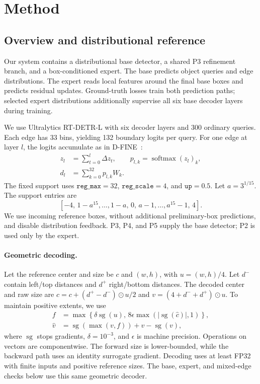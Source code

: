 \section{Method}
\subsection{Overview and distributional reference}
Our system contains a distributional base detector, a shared P3 refinement branch, and a box-conditioned expert. The base predicts object queries and edge distributions. The expert reads local features around the final base boxes and predicts residual updates. Ground-truth losses train both prediction paths; selected expert distributions additionally supervise all six base decoder layers during training.

We use Ultralytics RT-DETR-L with six decoder layers and 300 ordinary queries. Each edge has 33 bins, yielding 132 boundary logits per query. For one edge at layer $l$, the logits accumulate as in D-FINE~\cite{peng2025dfine}:
\begin{equation}
\begin{aligned}
z_l&=\sum_{t=0}^{l}\Delta z_t,\qquad
p_{l,k}=\operatorname{softmax}(z_l)_k,\\
d_l&=\sum_{k=0}^{32}p_{l,k}W_k .
\end{aligned}
\label{eq:distribution}
\end{equation}
The fixed support uses $\texttt{reg\_max}=32$, $\texttt{reg\_scale}=4$, and $\texttt{up}=0.5$. Let $a=3^{1/15}$. The support entries are
\[
[-4,\,1-a^{15},\ldots,1-a,\,0,\,a-1,\ldots,a^{15}-1,\,4].
\]
We use incoming reference boxes, without additional preliminary-box predictions, and disable distribution feedback. P3, P4, and P5 supply the base detector; P2 is used only by the expert.


\paragraph{Geometric decoding.}
Let the reference center and size be $c$ and $(w,h)$, with $u=(w,h)/4$. Let $d^{-}$ contain left/top distances and $d^{+}$ right/bottom distances. The decoded center and raw size are $\hat c=c+(d^{+}-d^{-})\odot u/2$ and $v=(4+d^{-}+d^{+})\odot u$. To maintain positive extents, we use
\begin{equation}
\begin{aligned}
f&=\max\!\left\{\delta\operatorname{sg}(u),\,
8\epsilon\max(|\operatorname{sg}(\hat c)|,1)\right\},\\
\hat v&=\operatorname{sg}(\max(v,f))+v-\operatorname{sg}(v),
\end{aligned}
\label{eq:geometry}
\end{equation}
where $\operatorname{sg}$ stops gradients, $\delta=10^{-3}$, and $\epsilon$ is machine precision. Operations on vectors are componentwise. The forward size is lower-bounded, while the backward path uses an identity surrogate gradient. Decoding uses at least FP32 with finite inputs and positive reference sizes. The base, expert, and mixed-edge checks below use this same geometric decoder.


